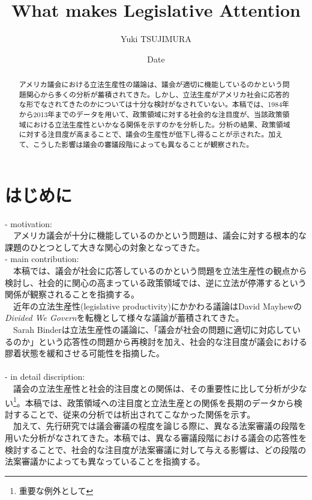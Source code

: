 \documentclass{article}
\title{What makes Legislative Attention}
\author{Yuki TSUJIMURA}
\date{Date}
\begin{document}
\maketitle

\begin{abstract}
アメリカ議会における立法生産性の議論は、議会が適切に機能しているのかという問題関心から多くの分析が蓄積されてきた。しかし、立法生産がアメリカ社会に応答的な形でなされてきたのかについては十分な検討がなされていない。本稿では、1984年から2013年までのデータを用いて、政策領域に対する社会的な注目度が、当該政策領域における立法生産性といかなる関係を示すのかを分析した。分析の結果、政策領域に対する注目度が高まることで、議会の生産性が低下し得ることが示された。加えて、こうした影響は議会の審議段階によっても異なることが観察された。
\end{abstract}


\section{はじめに}
- motivation: 
\\
　アメリカ議会が十分に機能しているのかという問題は、議会に対する根本的な課題のひとつとして大きな関心の対象となってきた。\\
- main contribution: 
\\
　本稿では、議会が社会に応答しているのかという問題を立法生産性の観点から検討し、社会的に関心の高まっている政策領域では、逆に立法が停滞するという関係が観察されることを指摘する。\\
　近年の立法生産性(legislative productivity)にかかわる議論はDavid Mayhewの\textit{Divided We Govern}を転機として様々な議論が蓄積されてきた。\\
　Sarah Binderは立法生産性の議論に、「議会が社会の問題に適切に対応しているのか」という応答性の問題から再検討を加え、社会的な注目度が議会における膠着状態を緩和させる可能性を指摘した。\citep*{Binder2003-bn}\\
\\
- in detail discription:
\\
　議会の立法生産性と社会的注目度との関係は、その重要性に比して分析が少ない\footnote{重要な例外として\citet*{Adler2013-ay}}。本稿では、政策領域への注目度と立法生産との関係を長期のデータから検討することで、従来の分析では析出されてこなかった関係を示す。\\
　加えて、先行研究では議会審議の程度を論じる際に、異なる法案審議の段階を用いた分析がなされてきた。本稿では、異なる審議段階における議会の応答性を検討することで、社会的な注目度が法案審議に対して与える影響は、どの段階の法案審議かによっても異なっていることを指摘する。\\
\end{document}
